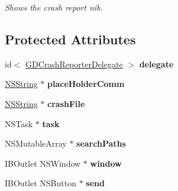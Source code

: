 \begin{DoxyCompactItemize}
\begin{DoxyCompactList}\small\item\em Shows the crash report nib. \item\end{DoxyCompactList}\end{DoxyCompactItemize}
\subsection*{Protected Attributes}
\begin{DoxyCompactItemize}
\item 
\hypertarget{interface_g_d_crash_reporter_a361d828b4c2be746b9f3af8c540c8783}{
id$<$ \hyperlink{protocol_g_d_crash_reporter_delegate-p}{GDCrashReporterDelegate} $>$ {\bfseries delegate}}
\label{interface_g_d_crash_reporter_a361d828b4c2be746b9f3af8c540c8783}

\item 
\hypertarget{interface_g_d_crash_reporter_a4163a934fc54bfd941c88466c8aa3119}{
\hyperlink{class_n_s_string}{NSString} $\ast$ {\bfseries placeHolderComm}}
\label{interface_g_d_crash_reporter_a4163a934fc54bfd941c88466c8aa3119}

\item 
\hypertarget{interface_g_d_crash_reporter_af2e412a66d56341f386c0a4857e70692}{
\hyperlink{class_n_s_string}{NSString} $\ast$ {\bfseries crashFile}}
\label{interface_g_d_crash_reporter_af2e412a66d56341f386c0a4857e70692}

\item 
\hypertarget{interface_g_d_crash_reporter_a0d9bcf4ad79589e4e97171b6d8f64cfe}{
NSTask $\ast$ {\bfseries task}}
\label{interface_g_d_crash_reporter_a0d9bcf4ad79589e4e97171b6d8f64cfe}

\item 
\hypertarget{interface_g_d_crash_reporter_a1996cf83ef0f805d3b2a388180c4edb7}{
NSMutableArray $\ast$ {\bfseries searchPaths}}
\label{interface_g_d_crash_reporter_a1996cf83ef0f805d3b2a388180c4edb7}

\item 
\hypertarget{interface_g_d_crash_reporter_aa5cadf563ca96435ae93811507ac11d3}{
IBOutlet NSWindow $\ast$ {\bfseries window}}
\label{interface_g_d_crash_reporter_aa5cadf563ca96435ae93811507ac11d3}

\item 
\hypertarget{interface_g_d_crash_reporter_a5658d8c28b96de69684fa9f5201e0b60}{
IBOutlet NSButton $\ast$ {\bfseries send}}
\label{interface_g_d_crash_reporter_a5658d8c28b96de69684fa9f5201e0b60}


\end{DoxyCompactItemize}
